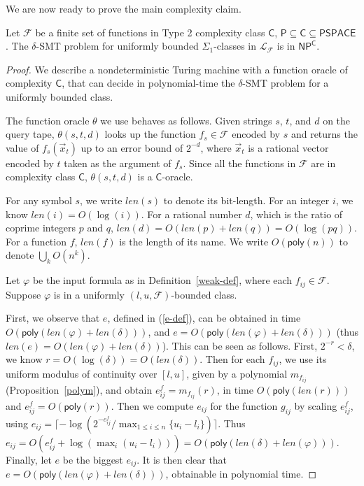 \documentclass[envcountsect]{llncs}
\newcommand{\len}{\mathit{len}}
\newcommand{\poly}{\mathsf{poly}}
\begin{document}
We are now ready to prove the main complexity claim.

\begin{theorem}[Complexity]
Let $\mathcal{F}$ be a finite set of functions in Type 2 complexity class $\mathsf{C}$, $\mathsf{P}\subseteq\mathsf{C}\subseteq\mathsf{PSPACE}$. The $\delta$-SMT problem for uniformly bounded $\Sigma_1$-classes in $\mathcal{L}_{\mathcal{F}}$ is in $\mathsf{NP^C}$. 
\end{theorem}
\begin{proof}
We describe a nondeterministic Turing machine with a function oracle of complexity $\mathsf{C}$, that can decide in polynomial-time the $\delta$-SMT problem for a uniformly bounded class.

The function oracle $\theta$ we use behaves as follows. Given strings $s$, $t$, and $d$ on the query tape, $\theta(s,t,d)$ looks up the function $f_s\in \mathcal{F}$ encoded by $s$ and returns the value of $f_s({\vec x}_t)$ up to an error bound of $2^{-d}$, where ${\vec x}_t$ is a rational vector encoded by $t$ taken as the argument of $f_s$. Since all the functions in $\mathcal{F}$ are in complexity class $\mathsf{C}$, $\theta(s,t,d)$ is a $\mathsf{C}$-oracle. 

For any symbol $s$, we write $\len(s)$ to denote its bit-length. For an integer $i$, we know $\len(i)= O(\log(i))$. For a rational number $d$, which is the ratio of coprime integers $p$ and $q$, $\len(d)= O(\len(p)+\len(q))= O(\log(pq))$. For a function $f$, $len(f)$ is the length of its name. We write $O(\poly(n))$ to denote $\bigcup_kO(n^k)$. 

Let $\varphi$ be the input formula as in Definition~\ref{weak-def}, where each $f_{ij}\in \mathcal{F}$. Suppose $\varphi$ is in a uniformly $(l,u,\mathcal{F})$-bounded class. 

First, we observe that $e$, defined in (\ref{e-def}), can be obtained in time $O(\poly(\len(\varphi)+\len(\delta)))$, and $e = O(\poly(\len(\varphi)+\len(\delta)))$ (thus $\len(e) = O(\len(\varphi)+\len(\delta))$). This can be seen as follows. First, $2^{-r}<\delta$, we know $r= O(\log(\delta)) = O(\len(\delta))$. Then for each $f_{ij}$, we use its uniform modulus of continuity over $[l,u]$, given by a polynomial $m_{f_{ij}}$ (Proposition~\ref{polym}), and obtain $e_{ij}^f = m_{f_{ij}}(r)$, in time $O(\poly(\len(r)))$ and $e_{ij}^f = O(\poly(r))$. Then we compute $e_{ij}$ for the function $g_{ij}$ by scaling $e_{ij}^f$, using $e_{ij}  = \lceil -\log(2^{-e^f_{ij}}/\max_{1\leq i\leq n}\{u_i-l_i\})\rceil$. Thus $e_{ij} = O(e_{ij}^f+\log(\max_i(u_i-l_i))) = O(\poly(\len(\delta)+\len(\varphi)))$. Finally, let $e$ be the biggest $e_{ij}$. It is then clear that $e = O(\poly(\len(\varphi)+\len(\delta)))$, obtainable in polynomial time. 


\end{proof}
\end{document}
